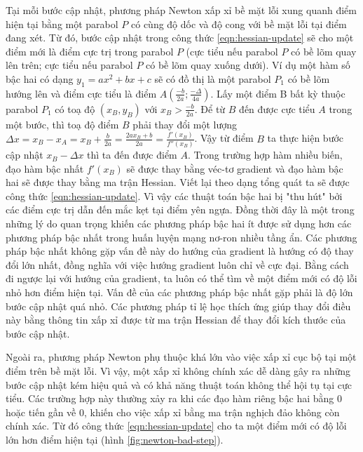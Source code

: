Tại mỗi bước cập nhật, phương pháp Newton xấp xỉ bề mặt lỗi xung quanh điểm hiện tại bằng một parabol $P$ có cùng độ dốc và độ cong với bề mặt lỗi tại điểm đang xét. Từ đó, bước cập nhật trong công thức \ref{eqn:hessian-update} sẽ cho một điểm mới là điểm cực trị trong parabol $P$ (cực tiểu nếu parabol $P$ có bề lõm quay lên trên; cực tiểu nếu parabol $P$ có bề lõm quay xuống dưới). Ví dụ một hàm số bậc hai có dạng $y_1 = ax^2 + bx + c$ sẽ có đồ thị là một parabol $P_1$ có bề lõm hướng lên và điểm cực tiểu là điểm $A(\frac{-b}{2a};\frac{-\Delta}{4a})$. Lấy một điểm B bất kỳ thuộc parabol $P_1$ có toạ độ $(x_B,y_B)$ với $x_B > \frac{-b}{2a}$. Để từ $B$ đến được cực tiểu $A$ trong một bước, thì toạ độ điểm $B$ phải thay đổi một lượng $\Delta x = x_B - x_A = x_B + \frac{b}{2a} = \frac{2ax_B + b}{2a} = \frac{f'(x_B)}{f''(x_B)}$. Vậy từ điểm $B$ ta thực hiện bước cập nhật $x_B - \Delta x$ thì ta đến được điểm $A$. Trong trường hợp hàm nhiều biến, đạo hàm bậc nhất $f'(x_B)$ sẽ được thay bằng véc-tơ gradient và đạo hàm bậc hai sẽ được thay bằng ma trận Hessian. Viết lại theo dạng tổng quát ta sẽ được công thức \ref{eqn:hessian-update}. Vì vậy các thuật toán bậc hai bị "thu hút" bởi các điểm cực trị dẫn đến mắc kẹt tại điểm yên ngựa. Đồng thời đây là một trong những lý do quan trọng khiến các phương pháp bậc hai ít được sử dụng hơn các phương pháp bậc nhất trong huấn luyện mạng nơ-ron nhiều tầng ẩn. Các phương pháp bậc nhất không gặp vấn đề này do hướng của gradient là hướng có độ thay đổi lớn nhất, đồng nghĩa với việc hướng gradient luôn chỉ về cực đại. Bằng cách đi ngược lại với hướng của gradient, ta luôn có thể tìm về một điểm mới có độ lỗi nhỏ hơn điểm hiện tại. Vấn đề của các phương pháp bậc nhất gặp phải là độ lớn bước cập nhật quá nhỏ. Các phương pháp tỉ lệ học thích ứng giúp thay đổi điều này bằng thông tin xấp xỉ được từ ma trận Hessian để thay đổi kích thước của bước cập nhật.

Ngoài ra, phương pháp Newton phụ thuộc khá lớn vào việc xấp xỉ cục bộ tại một điểm trên bề mặt lỗi. Vì vậy, một xấp xỉ không chính xác dễ dàng gây ra những bước cập nhật kém hiệu quả và có khả năng thuật toán không thể hội tụ tại cực tiểu. Các trường hợp này thường xảy ra khi các đạo hàm riêng bậc hai bằng 0 hoặc tiến gần về 0, khiến cho việc xấp xỉ bằng ma trận nghịch đảo không còn chính xác. Từ đó công thức \ref{eqn:hessian-update} cho ta một điểm mới có độ lỗi lớn hơn điểm hiện tại (hình \ref{fig:newton-bad-step}).

